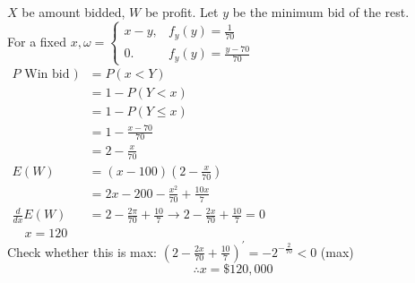 \documentclass[]{article}
\begin{document}
\Let $X$ be amount bidded, $W$ be profit. Let $y$ be the minimum bid of the rest.\\
For a fixed $x, \omega=\left\{\begin{array}{lll}x-y, & f_y(y)=\frac{1}{70} \\ 0 . & f_y(y)=\frac{y-70}{70}\end{array}\right.$\\
$\begin{aligned}P \text { Win bid }) &=P(x<Y) \\ &=1-P(Y<x) \\ &=1-P(Y \leqslant x) \\ &=1-\frac{x-70}{70} \\ &=2-\frac{x}{70} \\ E(W) &=(x-100)\left(2-\frac{x}{70}\right) \\ &=2 x-200-\frac{x^2}{70}+\frac{10 x}{7} \\ \frac{d}{d x} E(W) &=2-\frac{2 \pi}{70}+\frac{10}{7} \rightarrow 2-\frac{2 x}{70}+\frac{10}{7}=0 \\ \quad x=120 \end{aligned}$\\
Check whether this is max: $\left(2-\frac{2 x}{70}+\frac{10}{7}\right)^{\prime}=-2^{-\frac{2}{70}}<0$ (max)
$$
\therefore x=\$ 120,000
$$
\end{document}
